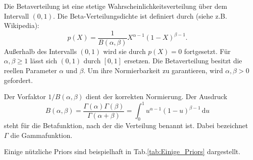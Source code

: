 Die Betaverteilung ist eine stetige Wahrscheinlichkeitsverteilung über dem Intervall $( 0 , 1 )$.
Die Beta-Verteilungsdichte ist definiert durch (siehe z.B. Wikipedia): 
\[
p(X) = \frac{1}{B(\alpha,\beta)} X^{\alpha-1}(1-X)^{\beta-1}.
\]
Außerhalb des Intervalls $(0,1)$ wird sie durch $p(X)=0$ fortgesetzt. 
Für $\alpha,\beta \geq 1$ lässt sich $(0,1)$ durch $[0,1]$ ersetzen. Die Betaverteilung besitzt die reellen Parameter $\alpha$ und $\beta$. Um ihre Normierbarkeit zu garantieren, wird $\alpha,\beta > 0$ gefordert.

Der Vorfaktor $1/B(\alpha,\beta)$ dient der korrekten Normierung. Der Ausdruck
\[B(\alpha,\beta) = \frac{\Gamma(\alpha) \Gamma(\beta)}{\Gamma(\alpha+\beta)} = \int_0^1 u^{\alpha-1} (1-u)^{\beta-1}\, \mathrm{d}u 
\]
steht für die Betafunktion, nach der die Verteilung benannt ist. Dabei bezeichnet $\Gamma$ die Gammafunktion.

Einige nützliche Priors sind beispielhaft in Tab.\ref{tab:Einige_Priors} dargestellt.

